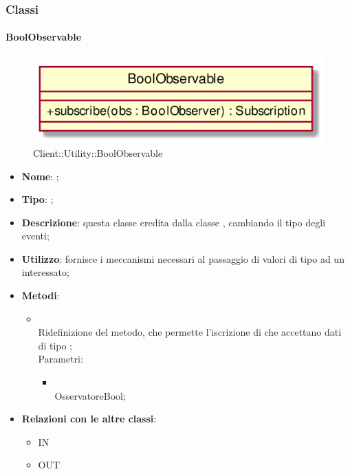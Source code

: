 \subsubsection{Classi}
\hypertarget{BoolObservable_label}{\paragraph{BoolObservable}}
\begin{figure}[h]
	\centering
	\includegraphics[width=\textwidth,height=\textheight,keepaspectratio]{images/ClassBoolObservable.png}
	\caption{Client::Utility::BoolObservable}
\end{figure}
\begin{itemize}
	\item \textbf{Nome}: ;
	\item \textbf{Tipo}: ;
	\item \textbf{Descrizione}: questa classe eredita dalla classe , cambiando il tipo degli eventi;
	\item \textbf{Utilizzo}: fornisce i meccanismi necessari al passaggio di valori di tipo  ad un  interessato;
	\item \textbf{Metodi}:
	\begin{itemize}
		\item[]  \\
		Ridefinizione del metodo, che permette l'iscrizione di  che accettano dati di tipo ;\\
		Parametri:
		\begin{itemize}
			\item {} \\
			OsservatoreBool;
		\end{itemize}
	\end{itemize}
	\item \textbf{Relazioni con le altre classi}:
	\begin{itemize}
		\item IN \hyperlink{Player_label}{}
		\item OUT \hyperlink{BoolObserver_label}{}
	\end{itemize}
\end{itemize}
\FloatBarrier

